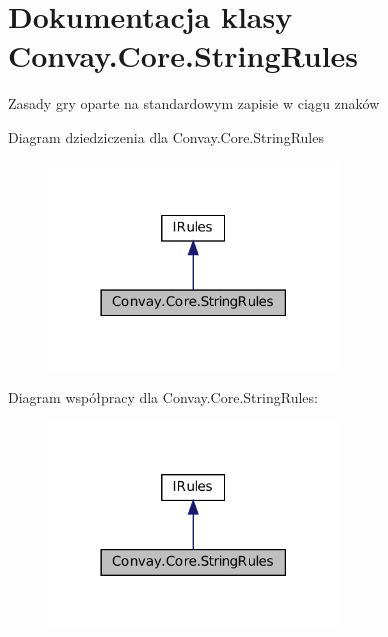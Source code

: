 \hypertarget{class_convay_1_1_core_1_1_string_rules}{}\section{Dokumentacja klasy Convay.\+Core.\+String\+Rules}
\label{class_convay_1_1_core_1_1_string_rules}


Zasady gry oparte na standardowym zapisie w ciągu znaków  




Diagram dziedziczenia dla Convay.\+Core.\+String\+Rules
\nopagebreak
\begin{figure}[H]
\begin{center}
\leavevmode
\includegraphics[width=218pt]{class_convay_1_1_core_1_1_string_rules__inherit__graph}
\end{center}
\end{figure}


Diagram współpracy dla Convay.\+Core.\+String\+Rules\+:
\nopagebreak
\begin{figure}[H]
\begin{center}
\leavevmode
\includegraphics[width=218pt]{class_convay_1_1_core_1_1_string_rules__coll__graph}
\end{center}
\end{figure}

